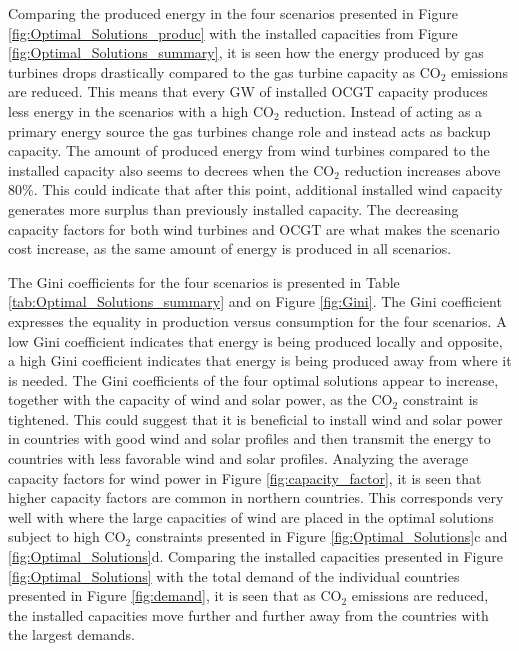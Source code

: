 Comparing the produced energy in the four scenarios presented in Figure \ref{fig:Optimal_Solutions_produc} with the installed capacities from Figure \ref{fig:Optimal_Solutions_summary}, it is seen how the energy produced by gas turbines drops drastically compared to the gas turbine capacity as $\text{CO}_2$ emissions are reduced. This means that every GW of installed OCGT capacity produces less energy in the scenarios with a high $\text{CO}_2$ reduction. Instead of acting as a primary energy source the gas turbines change role and instead acts as backup capacity. The amount of produced energy from wind turbines compared to the installed capacity also seems to decrees when the $\text{CO}_2$ reduction increases above 80\%. This could indicate that after this point, additional installed wind capacity generates more surplus than previously installed capacity. The decreasing capacity factors for both wind turbines and OCGT are what makes the scenario cost increase, as the same amount of energy is produced in all scenarios. 


The Gini coefficients for the four scenarios is presented in Table \ref{tab:Optimal_Solutions_summary} and on Figure \ref{fig:Gini}. The Gini coefficient expresses the equality in production versus consumption for the four scenarios. A low Gini coefficient indicates that energy is being produced locally and opposite, a high Gini coefficient indicates that energy is being produced away from where it is needed. The Gini coefficients of the four optimal solutions appear to increase, together with the capacity of wind and solar power, as the $\text{CO}_2$ constraint is tightened. This could suggest that it is beneficial to install wind and solar power in countries with good wind and solar profiles and then transmit the energy to countries with less favorable wind and solar profiles. Analyzing the average capacity factors for wind power in Figure \ref{fig:capacity_factor}, it is seen that higher capacity factors are common in northern countries. This corresponds very well with where the large capacities of wind are placed in the optimal solutions subject to high $\text{CO}_2$ constraints presented in Figure \ref{fig:Optimal_Solutions}c and \ref{fig:Optimal_Solutions}d. Comparing the installed capacities presented in Figure \ref{fig:Optimal_Solutions} with the total demand of the individual countries presented in Figure \ref{fig:demand}, it is seen that as $\text{CO}_2$ emissions are reduced, the installed capacities move further and further away from the countries with the largest demands. 

